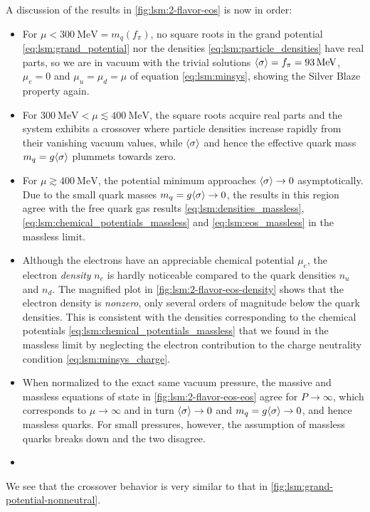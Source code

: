 A discussion of the results in \cref{fig:lsm:2-flavor-eos} is now in order:
\begin{itemize}
\item For $\mu < \SI{300}{\mega\electronvolt} = m_q(f_\pi)$, no square roots in the grand potential \eqref{eq:lsm:grand_potential} nor the densities \eqref{eq:lsm:particle_densities} have real parts, so we are in vacuum with the trivial solutions $\langle \sigma \rangle = f_\pi = \SI{93}{\mega\electronvolt}$, $\mu_e = 0$ and $\mu_u = \mu_d = \mu$ of equation \eqref{eq:lsm:minsys}, showing the Silver Blaze property again.
\item For $\SI{300}{\mega\electronvolt} < \mu \lesssim \SI{400}{\mega\electronvolt}$, the square roots acquire real parts and the system exhibits a crossover where particle densities increase rapidly from their vanishing vacuum values, while $\langle \sigma \rangle$ and hence the effective quark mass $m_q = g \langle \sigma \rangle$ plummets towards zero.
\item For $\mu \gtrsim \SI{400}{\mega\electronvolt}$, the potential minimum approaches $\langle \sigma \rangle \rightarrow 0$ asymptotically.
      Due to the small quark masses $m_q = g \langle \sigma \rangle \rightarrow 0$, the results in this region agree with the free quark gas results \eqref{eq:lsm:densities_massless}, \eqref{eq:lsm:chemical_potentials_massless} and \eqref{eq:lsm:eos_massless} in the massless limit.
\item Although the electrons have an appreciable chemical potential $\mu_e$, the electron \emph{density} $n_e$ is hardly noticeable compared to the quark densities $n_u$ and $n_d$.
      The magnified plot in \cref{fig:lsm:2-flavor-eos-density} shows that the electron density is \emph{nonzero}, only several orders of magnitude below the quark densities.
      This is consistent with the densities corresponding to the chemical potentials \eqref{eq:lsm:chemical_potentials_massless} that we found in the massless limit by neglecting the electron contribution to the charge neutrality condition \eqref{eq:lsm:minsys_charge}.
\item When normalized to the exact same vacuum pressure, the massive and massless equations of state in \cref{fig:lsm:2-flavor-eos-eos} agree for $P \rightarrow \infty$, which corresponds to $\mu \rightarrow \infty$ and in turn $\langle \sigma \rangle \rightarrow 0$ and $m_q = g \langle \sigma \rangle \rightarrow 0$, and hence massless quarks.
      For small pressures, however, the assumption of massless quarks breaks down and the two disagree.
\item {}
\end{itemize}
We see that the crossover behavior is very similar to that in \cref{fig:lsm:grand-potential-nonneutral}.

